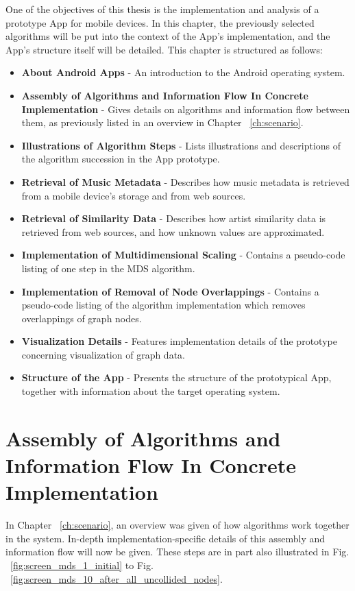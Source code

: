 One of the objectives of this thesis is the implementation and analysis of a prototype App for mobile devices. In this chapter, the previously selected algorithms will be put into the context of the App's implementation, and the App's structure itself will be detailed. This chapter is structured as follows:

\begin{itemize}
	\item \textbf {About Android Apps} - An introduction to the Android operating system.
	\item \textbf {Assembly of Algorithms and Information Flow In Concrete Implementation} - Gives details on algorithms and information flow between them, as previously listed in an overview in Chapter ~\ref{ch:scenario}.
	\item \textbf {Illustrations of Algorithm Steps} - Lists illustrations and descriptions of the algorithm succession in the App prototype.
	\item \textbf {Retrieval of Music Metadata} - Describes how music metadata is retrieved from a mobile device's storage and from web sources.
	\item \textbf {Retrieval of Similarity Data} - Describes how artist similarity data is retrieved from web sources, and how unknown values are approximated.
	\item \textbf {Implementation of Multidimensional Scaling} - Contains a pseudo-code listing of one step in the MDS algorithm.
	\item \textbf {Implementation of Removal of Node Overlappings} - Contains a pseudo-code listing of the algorithm implementation which removes overlappings of graph nodes.
	\item \textbf {Visualization Details} - Features implementation details of the prototype concerning visualization of graph data.
	\item \textbf {Structure of the App} - Presents the structure of the prototypical App, together with information about the target operating system.
\end{itemize}

\section{Assembly of Algorithms and Information Flow In Concrete Implementation}
\label{sec:algorithm-assembly}

In Chapter ~\ref{ch:scenario}, an overview was given of how algorithms work together in the system. In-depth implementation-specific details of this assembly and information flow will now be given. These steps are in part also illustrated in Fig. ~\ref{fig:screen_mds_1_initial} to Fig. ~\ref{fig:screen_mds_10_after_all_uncollided_nodes}.

